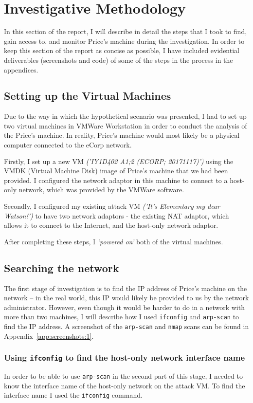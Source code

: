 \documentclass[12pt]{report}
\newcommand{\term}[1]{\colorbox{light-gray}{\texttt{#1}}}
\begin{document}
\pagebreak
\chapter{Investigative Methodology}
In this section of the report, I will describe in detail the steps that I took to find, gain access to, and monitor Price's machine during the investigation. In order to keep this section of the report as concise as possible, I have included evidential deliverables (screenshots and code) of some of the steps in the process in the appendices.


\section*{Setting up the Virtual Machines}
Due to the way in which the hypothetical scenario was presented, I had to set up two virtual machines in VMWare Workstation in order to conduct the analysis of the Price's machine. In reality, Price's machine would most likely be a physical computer connected to the eCorp network.

Firstly, I set up a new VM \textit{('IY1D402 A1;2 (ECORP; 20171117)')} using the VMDK (Virtual Machine Disk) image of Price's machine that we had been provided. I configured the network adaptor in this machine to connect to a host-only network, which was provided by the VMWare software.

Secondly, I configured my existing attack VM \textit{('It's Elementary my dear Watson!')} to have two network adaptors - the existing NAT adaptor, which allows it to connect to the Internet, and the host-only network adaptor.

After completing these steps, I \textit{'powered on'} both of the virtual machines.


\section{Searching the network}
The first stage of investigation is to find the IP address of Price's machine on the network -- in the real world, this IP would likely be provided to us by the network administrator. However, even though it would be harder to do in a network with more than two machines, I will describe how I used \texttt{ifconfig} and \texttt{arp-scan} to find the IP address. A screenshot of the \texttt{arp-scan} and \texttt{nmap} scans can be found in Appendix~\ref{app:screenshots:1}.

\subsection*{Using \texttt{ifconfig} to find the host-only network interface name}
In order to be able to use \texttt{arp-scan} in the second part of this stage, I needed to know the interface name of the host-only network on the attack VM. To find the interface name I used the \term{ifconfig} command.
\end{document}
